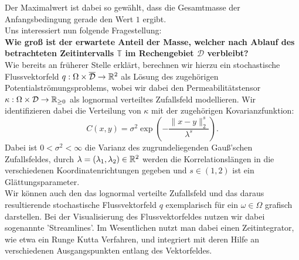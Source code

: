 Der Maximalwert ist dabei so gewählt, dass die Gesamtmasse der Anfangsbedingung gerade den Wert $ 1 $ ergibt.\\
Uns interessiert nun folgende Fragestellung: \\
\textbf{Wie groß ist der erwartete Anteil der Masse, welcher nach Ablauf des betrachteten Zeitintervalls $ \mathbb{T} $ im Rechengebiet $ \mathcal{D} $ verbleibt?}\\

Wie bereits an früherer Stelle erklärt, berechnen wir hierzu ein stochastische Flussvektorfeld $ q : \Omega \times \overline{\mathcal{ D}} \to \mathbb{R}^2 $ als Lösung des zugehörigen Potentialströmungsproblems, wobei wir dabei den Permeabilitätstensor $ \kappa : \Omega \times \mathcal{D} \to \mathbb{R}_{\geq0} $ als lognormal verteiltes Zufallsfeld modellieren. Wir identifizieren dabei die Verteilung von $ \kappa $ mit der zugehörigen Kovarianzfunktion:
\[
 C(x,y) = \sigma^2 \exp(- \frac{\lVert x-y \rVert_2^s}{\lambda^s} ) .
\]
Dabei ist $ 0 < \sigma^2 < \infty $ die Varianz des zugrundeliegenden Gauß'schen Zufallsfeldes, durch $ \lambda = (\lambda_1,\lambda_2) \in \mathbb{R}^2 $ werden die Korrelationslängen in die verschiedenen Koordinatenrichtungen gegeben und $ s \in (1,2) $ ist ein Glättungsparameter. \\
Wir können auch den das lognormal verteilte Zufallsfeld und das daraus resultierende stochastische Flussvektorfeld $ q $ exemplarisch für ein $ \omega \in \Omega $ grafisch darstellen. Bei der Visualisierung des Flussvektorfeldes nutzen wir dabei sogenannte 'Streamlines'. Im Wesentlichen nutzt man dabei einen Zeitintegrator, wie etwa ein Runge Kutta Verfahren, und integriert mit deren Hilfe an verschiedenen Ausgangspunkten entlang des Vektorfeldes.

